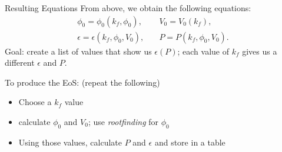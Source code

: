 \documentclass[]{beamer}
\begin{document}
    \begin{frame}{Resulting Equations}
        From above, we obtain the following equations:
        \begin{align*}
            \phi_0 = \phi_0(k_f, \phi_0), &\quad  
            V_0 = V_0(k_f), \\
            \epsilon = \epsilon(k_f,\phi_0,V_0), &\quad
            P  = P(k_f,\phi_0,V_0).
        \end{align*}
        \pause Goal: \pause create a list of values that show us $\epsilon(P)$; \pause each value of $k_f$ gives us a different $\epsilon$ and $P$. \pause

        \medskip
        To produce the EoS: \pause (repeat the following) \pause
        \begin{itemize}
            \item Choose a $k_f$ value \pause
            \item calculate $\phi_0$ and $V_0$\pause; use \textit{rootfinding} for $\phi_0$\pause
            \item Using those values, calculate $P$ and $\epsilon$ and store in a table
        \end{itemize}
    \end{frame}


    
\end{document}

